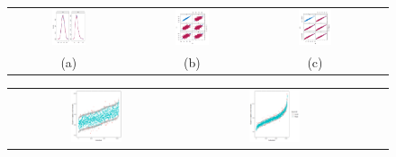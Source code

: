 \documentclass[12pt, fullpage, a4paper]{article}
\begin{document}
\begin{figure} [ht!]
	\centering
	\begin{tabular}{cccc}
		\includegraphics[width=0.3\textwidth]{plots/densitycase3} &
		\includegraphics[width=0.3\textwidth]{plots/scattercase3hm} &
		\includegraphics[width=0.3\textwidth]{plots/scattercase3wm} \\
		\textnormal{(a)}  & \textnormal{(b)} & \textnormal{(c)}  \\[6pt]
	\end{tabular}
	\begin{tabular}{cccc}
		\includegraphics[width=0.3\textwidth]{plots/distributioncase3hm} &
		\includegraphics[width=0.3\textwidth]{plots/distributioncase3wm} \\

\end{tabular}
\end{figure}
\end{document}
